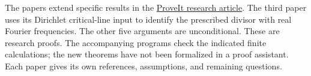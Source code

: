 \documentclass[11pt]{article}
\begin{document}
\vspace{7pt}
The papers extend specific results in the \href{https://github.com/VladimirReshetnikov/ProveIt/tree/ff96fd44ab160e65fb8a9d861243828d07c156cf/Analysis/GeneralizedRiemannHypothesis}{ProveIt research article}. The third paper uses its Dirichlet critical-line input to identify the prescribed divisor with real Fourier frequencies. The other five arguments are unconditional. These are research proofs. The accompanying programs check the indicated finite calculations; the new theorems have not been formalized in a proof assistant. Each paper gives its own references, assumptions, and remaining questions.
\end{document}
